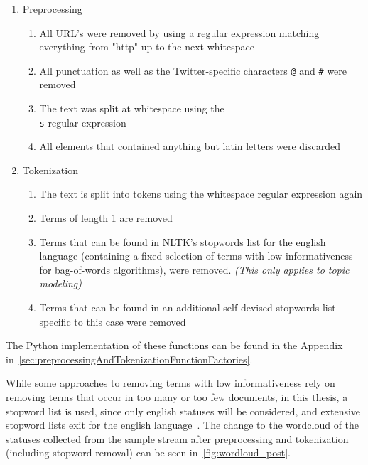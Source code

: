 \begin{enumerate}
    \item Preprocessing
    \begin{enumerate}
        \item All URL's were removed by using a regular expression matching everything from "http" up to the next whitespace
        \item All punctuation as well as the Twitter-specific characters \texttt{@} and \texttt{\#} were removed
        \item The text was split at whitespace using the \texttt{\\s} regular expression
        \item All elements that contained anything but latin letters were discarded
    \end{enumerate}
    \item Tokenization
    \begin{enumerate}
        \item The text is split into tokens using the whitespace regular expression again
        \item Terms of length 1 are removed
        \item Terms that can be found in NLTK's stopwords list for the english language
        (containing a fixed selection of terms with low informativeness for bag-of-words algorithms),
        were removed. \textit{(This only applies to topic modeling)}
        \item Terms that can be found in an additional self-devised stopwords list specific to this case were removed
    \end{enumerate}
\end{enumerate}

The Python implementation of these functions can be found in the Appendix in~\cref{sec:preprocessingAndTokenizationFunctionFactories}.

While some approaches to removing terms with low informativeness rely on removing terms that occur in too many or too few documents,
in this thesis, a stopword list is used,
since only english statuses will be considered, and extensive stopword lists exit for the english language~\cite{Porter2001}.
The change to the wordcloud of the statuses collected from the sample stream after preprocessing and tokenization (including stopword removal) can be seen in~\cref{fig:wordloud_post}.


